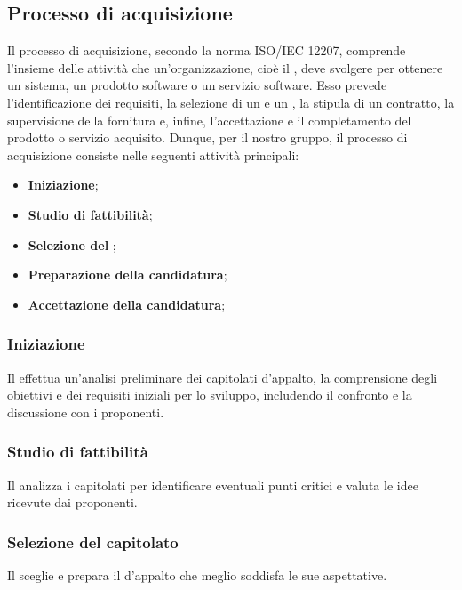 \subsection{Processo di acquisizione}
\label{subsection:Processo_acquisizione}
Il processo di acquisizione, secondo la norma ISO/IEC 12207, comprende l'insieme delle attività che un'organizzazione, cioè il , deve svolgere per ottenere un sistema, un prodotto software o un servizio software. Esso prevede l'identificazione dei requisiti, la selezione di un  e un , la stipula di un contratto, la supervisione della fornitura e, infine, l'accettazione e il completamento del prodotto o servizio acquisito.
Dunque, per il nostro gruppo, il processo di acquisizione consiste nelle seguenti attività principali:

\begin{itemize}
    \item \textbf{Iniziazione}; 
    \item \textbf{Studio di fattibilità}; 
    \item \textbf{Selezione del }; 
    \item \textbf{Preparazione della candidatura}; 
    \item \textbf{Accettazione della candidatura}; 
\end{itemize}

\subsubsection{Iniziazione}
Il  effettua un'analisi preliminare dei capitolati d’appalto, la comprensione degli obiettivi e dei requisiti iniziali per lo sviluppo, includendo il confronto e la discussione con i proponenti.

\subsubsection{Studio di fattibilità}
Il  analizza i capitolati per identificare eventuali punti critici e valuta le idee ricevute dai proponenti.

\subsubsection{Selezione del capitolato}
Il  sceglie e prepara il  d'appalto che meglio soddisfa le sue aspettative.

